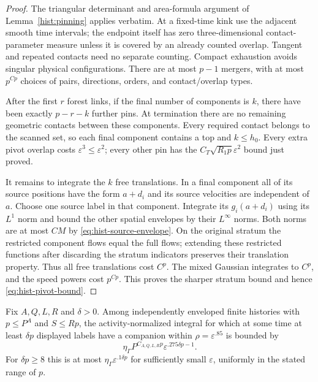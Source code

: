 \begin{proof}
The triangular determinant and area-formula argument of
Lemma~\ref{hist:pinning} applies verbatim.  At a fixed-time kink use
the adjacent smooth time intervals; the endpoint itself has zero
three-dimensional contact-parameter measure unless it is covered by
an already counted overlap.  Tangent and repeated contacts need no
separate counting.  Compact exhaustion avoids singular physical
configurations.  There are at most $p-1$ mergers, with at most
$p^{Cp}$ choices of pairs, directions, orders, and contact/overlap
types.

After the first $r$ forest links, if the final number of components
is $k$, there have been exactly $p-r-k$ further pins.  At termination
there are no remaining geometric contacts between these components.
Every required contact belongs to the scanned set, so each final
component contains a top and $k\leq h_0$.  Every extra pivot overlap
costs $\varepsilon^3\leq\varepsilon^2$; every other pin has the
$C_T\sqrt{R_1p}\varepsilon^2$ bound just proved.

It remains to integrate the $k$ free translations.  In a final
component all of its source positions have the form $a+d_i$ and
its source velocities are independent of $a$.  Choose one source
label in that component.  Integrate its $g_i(a+d_i)$ using its
$L^1$ norm and bound the other spatial envelopes by their $L^\infty$
norms.  Both norms are at most $C M$ by
\eqref{eq:hist-source-envelope}.  On the original stratum the
restricted component flows equal the full flows; extending these
restricted functions after discarding the stratum indicators
preserves their translation property.  Thus all free translations
cost $C^p$.  The mixed Gaussian integrates to $C^p$, and the speed
powers cost $p^{Cp}$.  This proves the sharper stratum bound and hence
\eqref{eq:hist-pivot-bound}.
\end{proof}

\begin{proposition}
\label{hist:crowding}
Fix $A,Q,L,R$ and $\delta>0$.  Among independently enveloped finite
histories with $p\leq P^A$ and $S\leq Rp$, the activity-normalized integral
for which at some time at least $\delta p$ displayed labels have a
companion within $\rho=\varepsilon^{.85}$ is bounded by
\begin{equation}
 \eta_\Gamma P^{C_{A,Q,L,R}p}
       \varepsilon^{.275\delta p-1}.
 \label{eq:hist-crowding-explicit}
\end{equation}
For $\delta p\geq8$ this is at most
$\eta_\Gamma\varepsilon^{.1\delta p}$ for sufficiently small
$\varepsilon$, uniformly in the stated range of $p$.
\end{proposition}

